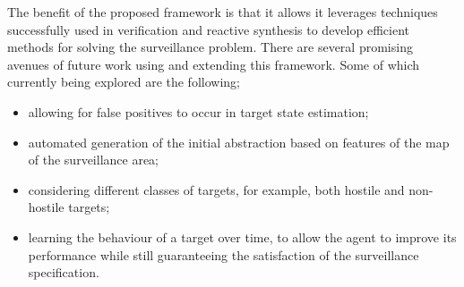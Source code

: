 The benefit of the proposed framework is that it allows it leverages techniques successfully used in verification and reactive synthesis to develop efficient methods for solving the surveillance problem. There are several promising  avenues of future work using and extending this framework. Some of which currently being explored are the following;
\begin{itemize}

\item allowing for false positives to occur in target state estimation;
\item automated generation of the initial abstraction based on features of the map of the surveillance area;
    \item considering different classes of targets, for example, both hostile and non-hostile targets;
    \item learning the behaviour of a target over time, to allow the agent to improve its performance while still guaranteeing the satisfaction of the surveillance specification. 
\end{itemize}